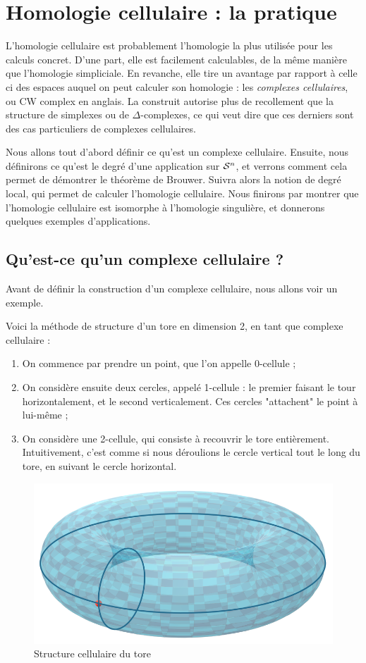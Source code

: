 
\section{Homologie cellulaire : la pratique}

L'homologie cellulaire est probablement l'homologie la plus utilisée pour les calculs concret. D'une part, elle est facilement calculables, de la même manière que l'homologie simpliciale. En revanche, elle tire un avantage par rapport à celle ci des espaces auquel on peut calculer son homologie : les \emph{complexes cellulaires}, ou CW complex en anglais. La construit autorise plus de recollement que la structure de simplexes ou de $\Delta$-complexes, ce qui veut dire que ces derniers sont des cas particuliers de complexes cellulaires.

\bigskip Nous allons tout d'abord définir ce qu'est un complexe cellulaire. Ensuite, nous définirons ce qu'est le degré d'une application sur $\mathcal{S}^{n}$, et verrons comment cela permet de démontrer le théorème de Brouwer. Suivra alors la notion de degré local, qui permet de calculer l'homologie cellulaire. Nous finirons par montrer que l'homologie cellulaire est isomorphe à l'homologie singulière, et donnerons quelques exemples d'applications.

\subsection{Qu'est-ce qu'un complexe cellulaire ?}

Avant de définir la construction d'un complexe cellulaire, nous allons voir un exemple.

\begin{exemple}
Voici la méthode de structure d'un tore en dimension 2, en tant que complexe cellulaire : \begin{enumerate}
    \item On commence par prendre un point, que l'on appelle 0-cellule ;
    \item On considère ensuite deux cercles, appelé 1-cellule : le premier faisant le tour horizontalement, et le second verticalement. Ces cercles "attachent" le point à lui-même ;
    \item On considère une 2-cellule, qui consiste à recouvrir le tore entièrement. Intuitivement, c'est comme si nous déroulions le cercle vertical tout le long du tore, en suivant le cercle horizontal.
\end{enumerate}
\begin{figure}[H]
    \centering
    \includegraphics[width=0.5\linewidth]{pictures/ToreCW.png}
    \caption{Structure cellulaire du tore}
    \label{fig:tore-cw}
\end{figure}
\end{exemple}

